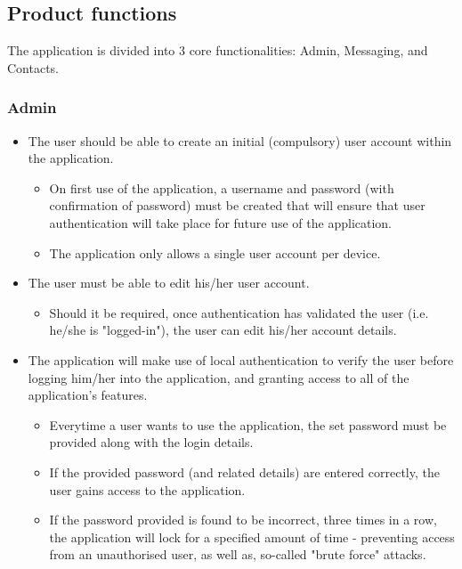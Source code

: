 \subsection{Product functions}
The application is divided into 3 core functionalities: Admin, Messaging, and Contacts.

\subsubsection{Admin}
\begin{itemize}
\item The user should be able to create an initial (compulsory) user account within the application.
\begin{itemize}
\item On first use of the application, a username and password (with confirmation of password) must be created that will ensure that user authentication will take place for future use of the application.
\item The application only allows a single user account per device.
\end{itemize}
\item The user must be able to edit his/her user account.
\begin{itemize}
\item Should it be required, once authentication has validated the user (i.e. he/she is "logged-in"), the user can edit his/her account details.
\end{itemize}
\item The application will make use of local authentication to verify the user before logging him/her into the application, and granting access to all of the application's features.
\begin{itemize}
\item Everytime a user wants to use the application, the set password must be provided along with the login details.
\item If the provided password (and related details) are entered correctly, the user gains access to the application.
\item If the password provided is found to be incorrect, three times in a row, the application will lock for a specified amount of time - preventing access from an unauthorised user, as well as, so-called "brute force" attacks.
\end{itemize}
\end{itemize}

